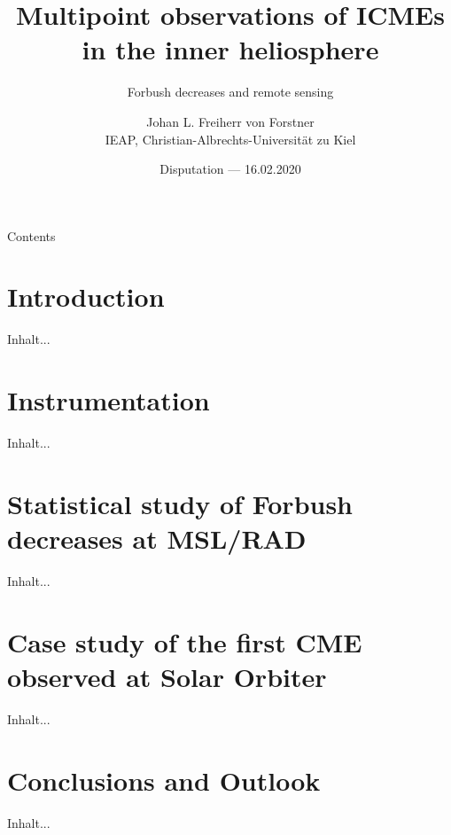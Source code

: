 \documentclass[10pt,aspectratio=169,usenames,dvipsnames]{beamer}
\title{Multipoint observations of ICMEs\\in the inner heliosphere}
\subtitle{Forbush decreases and remote sensing}
\author{Johan L. Freiherr von Forstner\\IEAP, Christian-Albrechts-Universität zu Kiel}
\date{Disputation --- 16.02.2020}
\begin{document}
\maketitle

\begin{frame}{Contents}
    \tableofcontents
\end{frame}

\section{Introduction}

\begin{frame}
    Inhalt...
\end{frame}

\section{Instrumentation}

\begin{frame}
    Inhalt...
\end{frame}

\section{Statistical study of Forbush decreases at MSL/RAD}

\begin{frame}
    Inhalt...
\end{frame}

\section{Case study of the first CME observed at Solar Orbiter}

\begin{frame}
    Inhalt...
\end{frame}

\section{Conclusions and Outlook}

\begin{frame}
    Inhalt...
\end{frame}
\end{document}
